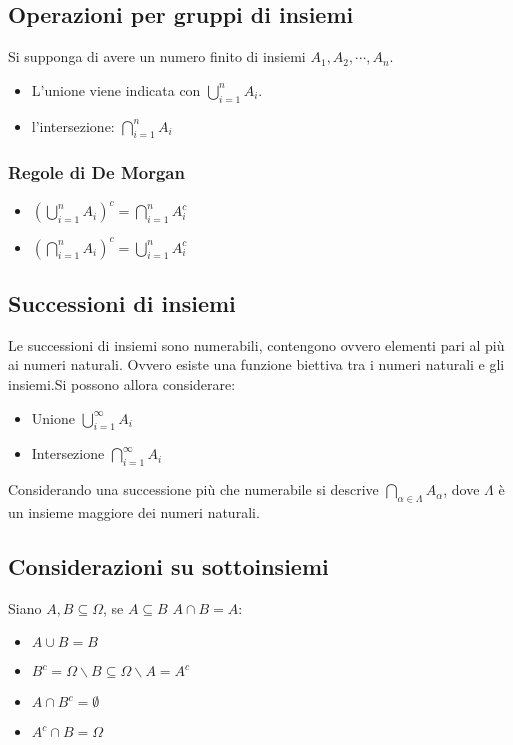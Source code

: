 \subsection{Operazioni per gruppi di insiemi}
Si supponga di avere un numero finito di insiemi $A_1, A_2, \cdots, A_n$.
\begin{itemize}
\item L'unione viene indicata con $\bigcup\limits_{i=1}^nA_i$.
\item  l'intersezione: $\bigcap\limits_{i=1}^nA_i$
\end{itemize}
\subsubsection{Regole di De Morgan} 
\begin{itemize}
\item $(\bigcup\limits_{i=1}^nA_i)^c=\bigcap\limits_{i=1}^nA_i^c$
\item $(\bigcap\limits_{i=1}^nA_i)^c=\bigcup\limits_{i=1}^nA_i^c$
\end{itemize}
\subsection{Successioni di insiemi}
Le successioni di insiemi sono numerabili, contengono ovvero elementi pari al pi\`u ai numeri naturali. Ovvero esiste una funzione biettiva tra i numeri naturali e gli insiemi.Si 
possono allora considerare:
\begin{itemize}
\item Unione $\bigcup\limits_{i=1}^\infty A_i$
\item Intersezione $\bigcap\limits_{i=1}^\infty A_i$
\end{itemize}
Considerando una successione pi\`u che numerabile si descrive $\bigcap\limits_{\alpha\in\Lambda}A_\alpha$, dove $\Lambda$ \`e un insieme maggiore dei numeri naturali.
\subsection{Considerazioni su sottoinsiemi}
Siano $A,B\subseteq\Omega$, se $A\subseteq B$ $A\cap B=A$:
\begin{itemize}
\item $A\cup B=B$
\item $B^c=\Omega\backslash B\subseteq \Omega\backslash A=A^c$ 
\item $A\cap B^c=\emptyset$
\item $A^c\cap B=\Omega$
\end{itemize}
